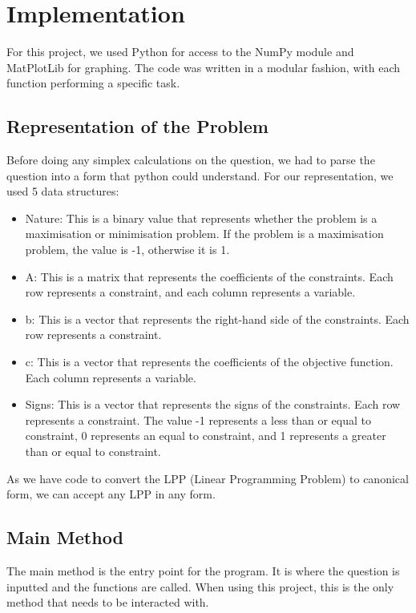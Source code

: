 \documentclass{article}
\numberwithin{equation}{section}
\begin{document}
\section{Implementation}
For this project, we used Python for access to the NumPy module and MatPlotLib for graphing. The code was written in a modular fashion, with each function performing a specific task.
\subsection{Representation of the Problem}
Before doing any simplex calculations on the question, we had to parse the question into a form that python could understand. For our representation, we used 5 data structures:
\begin{itemize}
    \item Nature: This is a binary value that represents whether the problem is a maximisation or minimisation problem. If the problem is a maximisation problem, the value is -1, otherwise it is 1.
    \item A: This is a matrix that represents the coefficients of the constraints. Each row represents a constraint, and each column represents a variable.
    \item b: This is a vector that represents the right-hand side of the constraints. Each row represents a constraint.
    \item c: This is a vector that represents the coefficients of the objective function. Each column represents a variable.
    \item Signs: This is a vector that represents the signs of the constraints. Each row represents a constraint. The value -1 represents a less than or equal to constraint, 0 represents an equal to constraint, and 1 represents a greater than or equal to constraint.
\end{itemize}
As we have code to convert the LPP (Linear Programming Problem) to canonical form, we can accept any LPP in any form.
\subsection{Main Method}
The main method is the entry point for the program. It is where the question is inputted and the functions are called. When using this project, this is the only method that needs to be interacted with.
\end{document}
